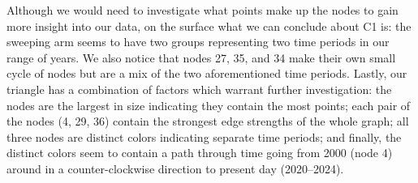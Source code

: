 \documentclass[10pt, letterpaper]{article}
\begin{document}
\begin{table}[H]


\caption{\label{tbl-Singleton_Summary}Singleton nodes and the years they
contain.}

\end{table}%

Although we would need to investigate what points make up the nodes to
gain more insight into our data, on the surface what we can conclude
about C1 is: the sweeping arm seems to have two groups representing two
time periods in our range of years. We also notice that nodes 27, 35,
and 34 make their own small cycle of nodes but are a mix of the two
aforementioned time periods. Lastly, our triangle has a combination of
factors which warrant further investigation: the nodes are the largest
in size indicating they contain the most points; each pair of the nodes
(4, 29, 36) contain the strongest edge strengths of the whole graph; all
three nodes are distinct colors indicating separate time periods; and
finally, the distinct colors seem to contain a path through time going
from 2000 (node 4) around in a counter-clockwise direction to present
day (2020--2024).
\end{document}
